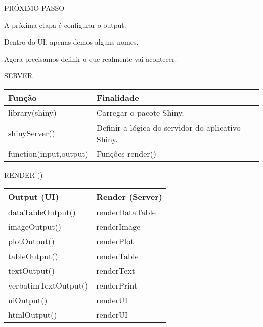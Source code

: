 \documentclass[
  ignorenonframetext,
]{beamer}
\begin{document}
\begin{frame}{PRÓXIMO PASSO}
\protect\hypertarget{proximo-passo-1}{}

\begin{center}
A próxima etapa é \alert{configurar} o output.
\end{center}
\begin{center} 
Dentro do UI, apenas demos alguns nomes.
\end{center}
\begin{center}
Agora precisamos definir o que realmente vai acontecer.
\end{center}

\end{frame}

\begin{frame}{SERVER}
\protect\hypertarget{server}{}

\begin{table}
\begin{tabular}{l | l}
Função & Finalidade \\
\hline \hline
library(shiny) & \small Carregar o pacote Shiny. \\
shinyServer() & \small Definir a lógica do servidor do aplicativo Shiny. \\ 
function(input,output){} & \small Funções render() \\
\end{tabular}
\end{table}

\end{frame}

\begin{frame}{RENDER ()}
\protect\hypertarget{render}{}

\begin{table}
\begin{tabular}{l | l}
Output (UI) & Render (Server) \\
\hline \hline
dataTableOutput() &  renderDataTable \\
imageOutput() & renderImage \\
plotOutput() & renderPlot \\
tableOutput() & renderTable \\
textOutput() & renderText \\
verbatimTextOutput() & renderPrint \\
uiOutput() & renderUI\\
htmlOutput() & renderUI \\ 
\end{tabular}
\end{table}

\end{frame}
\end{document}
